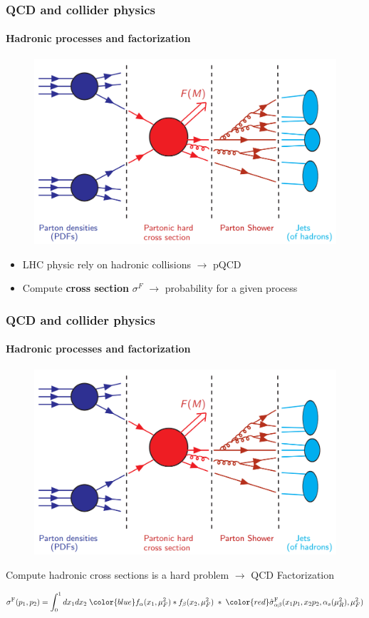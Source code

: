 \documentclass[aspectratio=43]{beamer}
\begin{document}
\begin{frame}
	
	\frametitle{QCD and collider physics}
	\framesubtitle{Hadronic processes and factorization}
	
	\footnotesize
	
	\vspace{0.4 cm}
	
	\begin{figure}
		\includegraphics[width = 7 cm]{plots/part1/chapter2/factorization_1.png}
	\end{figure}
	
	\begin{itemize}
		\item LHC physic rely on hadronic collisions $\longrightarrow$ pQCD
		\item Compute \textbf{cross section} $\sigma^{F}$ $\longrightarrow$ probability for a given process
	\end{itemize}

\end{frame}

\begin{frame}

	\frametitle{QCD and collider physics}
	\framesubtitle{Hadronic processes and factorization}
	
	\footnotesize
	
	\vspace{0.4 cm}
	
	\begin{figure}
		\includegraphics[width = 7 cm]{plots/part1/chapter2/factorization_1.png}
	\end{figure}
	
	Compute hadronic cross sections is a {\color{red}hard problem} $\longrightarrow$ {\color{blue} QCD Factorization}
	
	\begin{equation}
		\sigma^{\textrm{F}}(p_{1}, p_{2}) =
		\int_{0}^{1} dx_{1} dx_{2} \; {\color{blue} f_{\alpha}(x_{1}, \mu_{F}^{2}) \ast f_{\beta}(x_{2}, \mu_{F}^{2})}
		\; \ast \;  
		{\color{red}\hat{\sigma}^{\textrm{F}}_{\alpha \beta}(x_{1}p_{1}, x_{2}p_{2}, \alpha_{s}(\mu_{R}^{2}), \mu_{F}^{2})} \nonumber
	\end{equation}

\end{frame}
\end{document}
